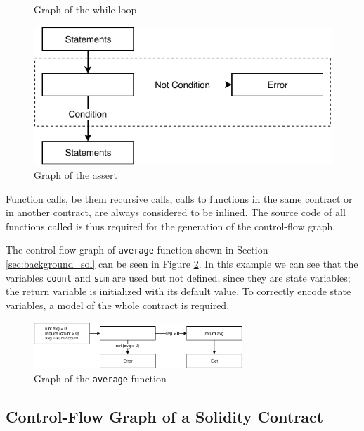 \begin{figure}[ht]
\begin{minipage}[h]{0.43\textwidth}
    \caption{Graph of the while-loop}
    \label{fig:cfg_while}
  \end{minipage}
  \begin{minipage}[h]{0.43\textwidth}
  	\centering
    \includegraphics[width=\textwidth]{images/assert}
    \caption{Graph of the assert}
    \label{fig:cfg_assert}
  \end{minipage}
\end{figure}

Function calls, be them  recursive calls, calls to functions in the same contract or in another contract, are always considered to be inlined. The source code of all functions called is thus required for the generation of the control-flow graph.

The control-flow graph of \texttt{average} function shown in Section \ref{sec:background_sol} can be seen in Figure \ref{fig:cfg_average}. In this example we can see that the variables \texttt{count} and \texttt{sum} are used but not defined, since they are state variables; the return variable is initialized with its default value. To correctly encode state variables, a model of the whole contract is required.

\begin{figure}[ht]
	\centering
	\includegraphics[width=0.7\textwidth]{images/average}
	\caption{Graph of the \texttt{average} function}
	\label{fig:cfg_average}
\end{figure}


\subsection{Control-Flow Graph of a Solidity Contract} \label{sec:sol_cfg_con}


